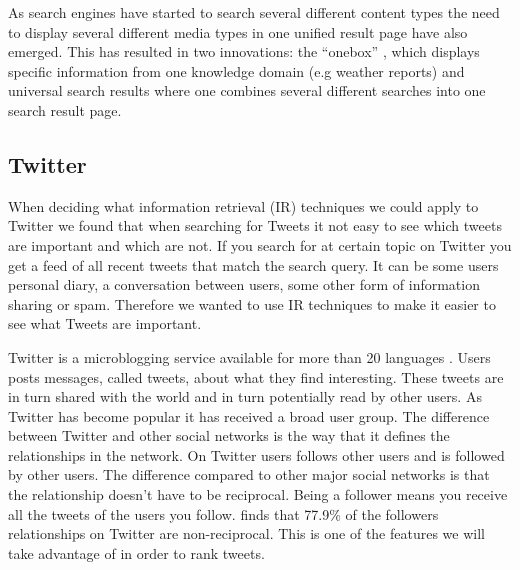 As search engines have started to search several different content types the need to display several different media types in one unified result page have also emerged. This has resulted in two innovations: the “onebox” \citep{Baeza-Yates2011}, which displays specific information from one knowledge domain (e.g weather reports) and universal search results where one combines several different searches into one search result page.

\subsection{Twitter}
\label{Twitter}
When deciding what information retrieval (IR) techniques we could apply to Twitter we found that when searching for Tweets it not easy to see which tweets are important and which are not. If you search for at certain topic on Twitter you get a feed of all recent tweets that match the search query. It can be some users personal diary, a conversation between users, some other form of information sharing or spam. Therefore we wanted to use IR techniques to make it easier to see what Tweets are important. 

Twitter is a microblogging service available for more than 20 languages \citep{Twitter2012}. Users posts messages, called tweets, about what they find interesting. These tweets are in turn shared with the world and in turn potentially read by other users. As Twitter has become popular it has received a broad user group. The difference between Twitter and other social networks is the way that it defines the relationships in the network. On Twitter users follows other users and is followed by other users. The difference compared to other major social networks is that the relationship doesn't have to be reciprocal. Being a follower means you receive all the tweets of the users you follow. \citep{Kwak2010} finds that 77.9\% of the followers relationships on Twitter are non-reciprocal. This is one of the features we will take advantage of in order to rank tweets. 


